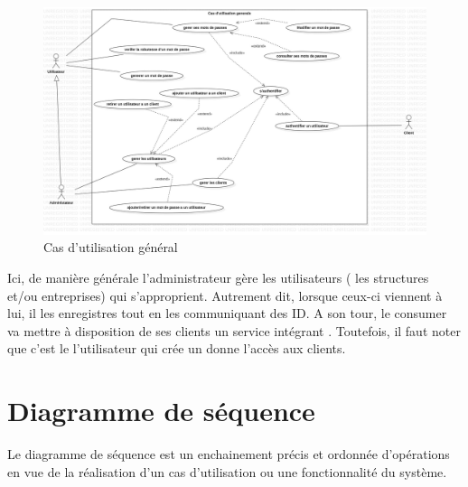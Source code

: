\documentclass[11pt,a4paper]{report}
\begin{document}
 \begin{center}
 \begin{figure}[H]
 \includegraphics[width=\linewidth]{img/jpg/safeprivacing-cas0.jpg}
 \caption{Cas d'utilisation général}
 \label{fig:diagram1}
 \end{figure}
 \end{center}
 Ici, de manière générale l'administrateur gère les utilisateurs ( les structures et/ou entreprises) qui s'approprient. Autrement dit, lorsque ceux-ci viennent à lui, il les enregistres tout en les communiquant des ID. A son tour, le consumer va mettre à disposition de ses clients un service intégrant . Toutefois, il faut noter que c'est le l'utilisateur qui crée un donne l'accès aux clients.

 \section{Diagramme de séquence}
 
 Le diagramme de séquence est un enchainement précis et ordonnée d'opérations en vue de la réalisation d'un cas d'utilisation ou une fonctionnalité du système.
\end{document}
